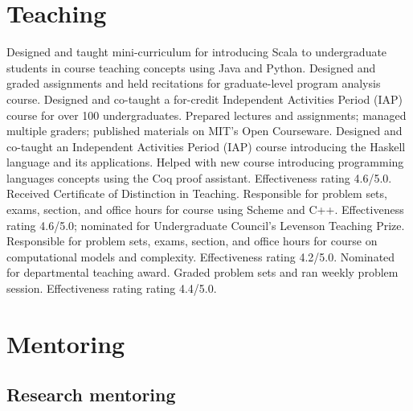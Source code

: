 \documentclass[10pt,a4paper]{moderncv}
\begin{document}
\section{Teaching}
  {}{Designed and taught mini-curriculum for introducing Scala to undergraduate students in course teaching concepts using Java and Python.}
  {}{Designed and graded assignments and held recitations for graduate-level program analysis course.}
  {}{Designed and co-taught a for-credit Independent Activities Period (IAP) course for over 100 undergraduates.  Prepared lectures and assignments; managed multiple graders; published materials on MIT's Open Courseware.}
  {}{Designed and co-taught an Independent Activities Period (IAP) course introducing the Haskell language and its applications.}
  {}{Helped with new course introducing programming languages concepts using the Coq proof assistant.  Effectiveness rating 4.6/5.0.  Received Certificate of Distinction in Teaching.}
  {Responsible for problem sets, exams, section, and office hours for course using Scheme and C++.  Effectiveness rating 4.6/5.0; nominated for Undergraduate Council's Levenson Teaching Prize.}
  {Responsible for problem sets, exams, section, and office hours for course on computational models and complexity.  Effectiveness rating 4.2/5.0.  Nominated for departmental teaching award.}
  {Graded problem sets and ran weekly problem session.  Effectiveness rating rating 4.4/5.0.}

\section{Mentoring}
\subsection{Research mentoring}
\end{document}
